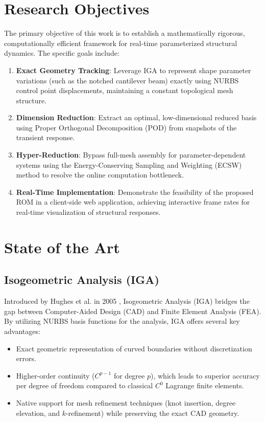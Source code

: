 \section{Research Objectives}

The primary objective of this work is to establish a mathematically rigorous, computationally efficient framework for real-time parameterized structural dynamics. The specific goals include:

\begin{enumerate}[leftmargin=*]
    \item \textbf{Exact Geometry Tracking}: Leverage IGA to represent shape parameter variations (such as the notched cantilever beam) exactly using NURBS control point displacements, maintaining a constant topological mesh structure.
    \item \textbf{Dimension Reduction}: Extract an optimal, low-dimensional reduced basis using Proper Orthogonal Decomposition (POD) from snapshots of the transient response.
    \item \textbf{Hyper-Reduction}: Bypass full-mesh assembly for parameter-dependent systems using the Energy-Conserving Sampling and Weighting (ECSW) method to resolve the online computation bottleneck.
    \item \textbf{Real-Time Implementation}: Demonstrate the feasibility of the proposed ROM in a client-side web application, achieving interactive frame rates for real-time visualization of structural responses.
\end{enumerate}

\section{State of the Art}

\subsection{Isogeometric Analysis (IGA)}
Introduced by Hughes et al. in 2005 \cite{hughes2005}, Isogeometric Analysis (IGA) bridges the gap between Computer-Aided Design (CAD) and Finite Element Analysis (FEA). By utilizing NURBS basis functions for the analysis, IGA offers several key advantages:
\begin{itemize}[leftmargin=*]
    \item Exact geometric representation of curved boundaries without discretization errors.
    \item Higher-order continuity ($C^{p-1}$ for degree $p$), which leads to superior accuracy per degree of freedom compared to classical $C^0$ Lagrange finite elements.
    \item Native support for mesh refinement techniques (knot insertion, degree elevation, and $k$-refinement) while preserving the exact CAD geometry.
\end{itemize}


